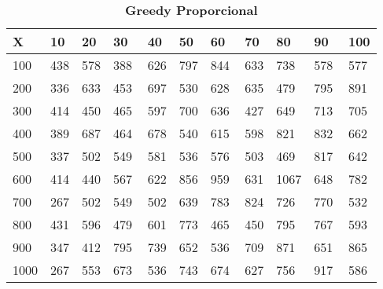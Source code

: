 \documentclass[10pt,letterpaper]{article}
\begin{document}
\begin{center}
\begin{table}\renewcommand{\arraystretch}{2.5}
\caption{\large \textbf{Greedy Proporcional}}
\centering
\begin{tabular} { |m{0.5cm}|m{1.3cm}|m{1.3cm}|m{1.3cm}|m{1.3cm}|m{1.3cm}|m{1.3cm}|m{1.3cm}|m{1.3cm}|m{1.3cm}|m{1.3cm}|} 
\hline
\rowcolor{Gray}
\centering \textbf{X} & \centering \textbf{10} & \centering \textbf{20} & \centering \textbf{30}\ & \centering \textbf{40} & \centering \textbf{50} & \centering \textbf{60}\ & \centering \textbf{70} & \centering \textbf{80} & \centering \textbf{90}\ & \textbf{100} \\\hline
\cellcolor{Gray}100 & \Large 438 & \Large 578 & \Large 388 & \Large 626 & \Large 797 & \Large 844 & \Large 633 & \Large 738 & \Large 578 & \Large 577 \\
\hline
\cellcolor{Gray}200 & \Large 336 & \Large 633 & \Large 453 & \Large 697 & \Large 530 & \Large 628 & \Large 635 & \Large 479 & \Large 795 & \Large 891 \\
\hline
\cellcolor{Gray}300 & \Large 414 & \Large 450 & \Large 465 & \Large 597 & \Large 700 & \Large 636 & \Large 427 & \Large 649 & \Large 713 & \Large 705 \\
\hline
\cellcolor{Gray}400 & \Large 389 & \Large 687 & \Large 464 & \Large 678 & \Large 540 & \Large 615 & \Large 598 & \Large 821 & \Large 832 & \Large 662 \\
\hline
\cellcolor{Gray}500 & \Large 337 & \Large 502 & \Large 549 & \Large 581 & \Large 536 & \Large 576 & \Large 503 & \Large 469 & \Large 817 & \Large 642 \\
\hline
\cellcolor{Gray}600 & \Large 414 & \Large 440 & \Large 567 & \Large 622 & \Large 856 & \Large 959 & \Large 631 & \Large 1067 & \Large 648 & \Large 782 \\
\hline
\cellcolor{Gray}700 & \Large 267 & \Large 502 & \Large 549 & \Large 502 & \Large 639 & \Large 783 & \Large 824 & \Large 726 & \Large 770 & \Large 532 \\
\hline
\cellcolor{Gray}800 & \Large 431 & \Large 596 & \Large 479 & \Large 601 & \Large 773 & \Large 465 & \Large 450 & \Large 795 & \Large 767 & \Large 593 \\
\hline
\cellcolor{Gray}900 & \Large 347 & \Large 412 & \Large 795 & \Large 739 & \Large 652 & \Large 536 & \Large 709 & \Large 871 & \Large 651 & \Large 865 \\
\hline
\cellcolor{Gray}1000 & \Large 267 & \Large 553 & \Large 673 & \Large 536 & \Large 743 & \Large 674 & \Large 627 & \Large 756 & \Large 917 & \Large 586 \\
\hline
\end{tabular} \\
\end{table}
\end{center}
\end{document}
